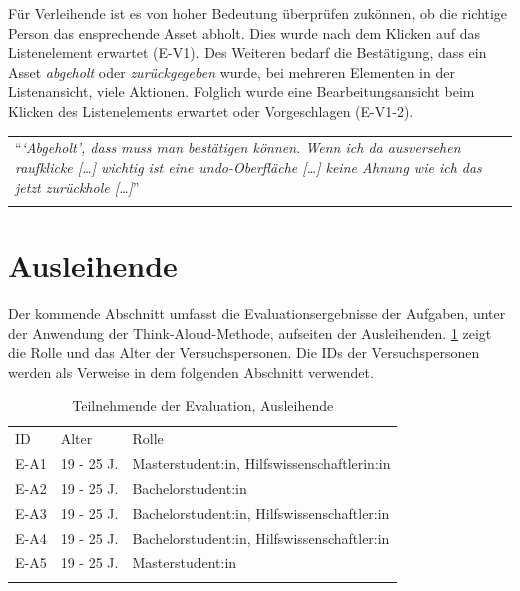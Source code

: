 Für Verleihende ist es von hoher Bedeutung überprüfen zukönnen, ob die richtige Person das
ensprechende Asset abholt. Dies wurde nach dem Klicken auf das Listenelement erwartet (E-V1). Des
Weiteren bedarf die Bestätigung, dass ein Asset \textit{abgeholt} oder \textit{zurückgegeben} wurde,
bei mehreren Elementen in der Listenansicht, viele Aktionen. Folglich wurde eine Bearbeitungsansicht
beim Klicken des Listenelements erwartet oder Vorgeschlagen (E-V1-2).

\begin{longtable}{p{}} \arrayrulecolor{maincolor}\hline
  \enquote{\textit{\enquote{Abgeholt}, dass muss man bestätigen können. Wenn ich da ausversehen
  raufklicke [\dots] wichtig ist eine undo-Oberfläche [\dots] keine Ahnung wie ich das jetzt
  zurückhole [\dots]}} \\
  \arrayrulecolor{maincolor}\hline
\end{longtable}

\section{Ausleihende}

Der kommende Abschnitt umfasst die Evaluationsergebnisse der Aufgaben, unter der Anwendung der
Think-Aloud-Methode, aufseiten der Ausleihenden. \ref{table:azwei} zeigt die Rolle und das Alter der
Versuchspersonen. Die IDs der Versuchspersonen werden als Verweise in dem folgenden Abschnitt
verwendet.

\begin{table}[h]
  \centering
  \caption{Teilnehmende der Evaluation, Ausleihende}
  \begin{tabular}{lll}
    \arrayrulecolor{maincolor}\hline
    \sffamily\color{maincolor}ID & \sffamily\color{maincolor}Alter & \sffamily\color{maincolor}Rolle
    \\
    \arrayrulecolor{maincolor}\hline
    E-A1                         & 19 - 25 J.                      & Masterstudent:in,
    Hilfswissenschaftlerin:in \\
    E-A2                         & 19 - 25 J.                      & Bachelorstudent:in
    \\
    E-A3                         & 19 - 25 J.                      & Bachelorstudent:in,
    Hilfswissenschaftler:in \\
    E-A4                         & 19 - 25 J.                      & Bachelorstudent:in,
    Hilfswissenschaftler:in \\
    E-A5                         & 19 - 25 J.                      & Masterstudent:in \\
    \arrayrulecolor{maincolor}\hline
  \end{tabular}
  \label{table:azwei}
\end{table}

